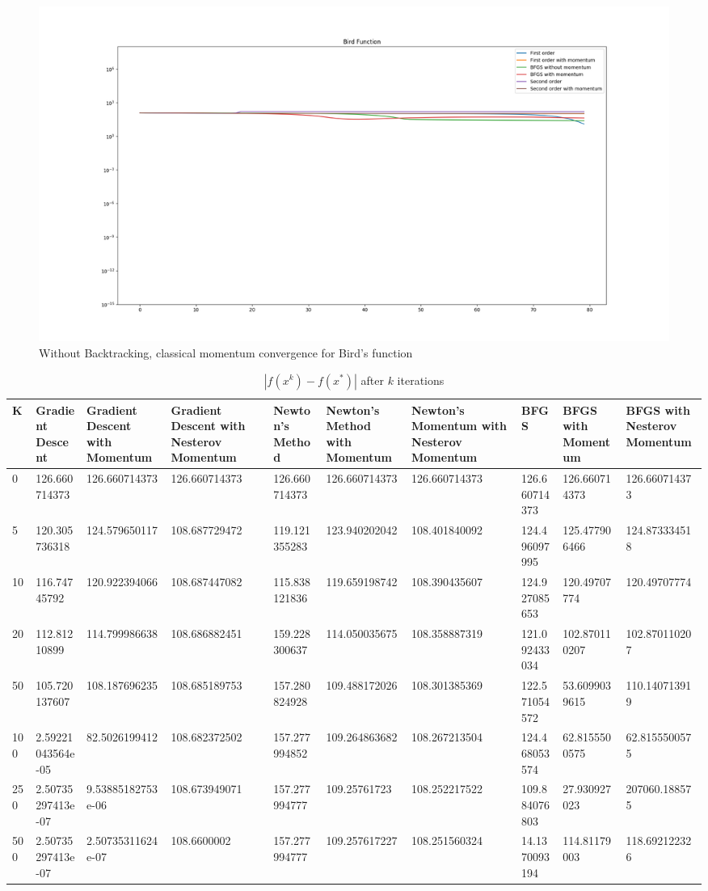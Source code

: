 \documentclass{article}
\begin{document}
\begin{figure}[H]
	\includegraphics[width=\linewidth]{../Images/birdmomentum1.png}
	\caption{Without Backtracking, classical momentum convergence for Bird's function}
	\label{fig:Without Backtracking, classical momentum convergence for Bird's function}
\end{figure}

\begin{table}[H]
	\centering
	\caption{$ | f(x^k) - f(x^*) | $ after $k$ iterations}
	\label{Bird's function table}
	\begin{tabular}{|l|l|l|l|l|l|l|l|l|l|}
		\hline
		K & Gradient Descent & Gradient Descent with Momentum & Gradient Descent with Nesterov Momentum & Newton's Method & Newton's Method with Momentum & Newton's Momentum with Nesterov Momentum & BFGS & BFGS with Momentum & BFGS with Nesterov Momentum \\
		\hline
		0 & 126.660714373 & 126.660714373 & 126.660714373 & 126.660714373 & 126.660714373 & 126.660714373 & 126.660714373 & 126.660714373 & 126.660714373 \\
		\hline
		5 & 120.305736318 & 124.579650117 & 108.687729472 & 119.121355283 & 123.940202042 & 108.401840092 & 124.496097995 & 125.477906466 & 124.873334518 \\
		\hline
		10 & 116.74745792 & 120.922394066 & 108.687447082 & 115.838121836 & 119.659198742 & 108.390435607 & 124.927085653 & 120.49707774 & 120.49707774 \\
		\hline
		20 & 112.81210899 & 114.799986638 & 108.686882451 & 159.228300637 & 114.050035675 & 108.358887319 & 121.092433034 & 102.870110207 & 102.870110207 \\
		\hline
		50 & 105.720137607 & 108.187696235 & 108.685189753 & 157.280824928 & 109.488172026 & 108.301385369 & 122.571054572 & 53.6099039615 & 110.140713919 \\
		\hline
		100 & 2.59221043564e-05 & 82.5026199412 & 108.682372502 & 157.277994852 & 109.264863682 & 108.267213504 & 124.468053574 & 62.8155500575 & 62.8155500575 \\
		\hline
		250 & 2.50735297413e-07 & 9.53885182753e-06 & 108.673949071 & 157.277994777 & 109.25761723 & 108.252217522 & 109.884076803 & 27.930927023 & 207060.188575 \\
		\hline
		500 & 2.50735297413e-07 & 2.50735311624e-07 & 108.6600002 & 157.277994777 & 109.257617227 & 108.251560324 & 14.1370093194 & 114.81179003 & 118.692122326 \\
		\hline
	\end{tabular}
\end{table}
\end{document}
